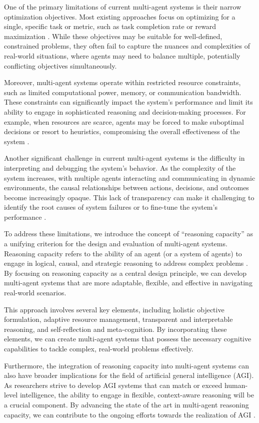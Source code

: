 \documentclass[11pt]{article}
\begin{document}
One of the primary limitations of current multi-agent systems is their narrow optimization objectives. Most existing approaches focus on optimizing for a single, specific task or metric, such as task completion rate or reward maximization \cite{ref341}. While these objectives may be suitable for well-defined, constrained problems, they often fail to capture the nuances and complexities of real-world situations, where agents may need to balance multiple, potentially conflicting objectives simultaneously.

Moreover, multi-agent systems operate within restricted resource constraints, such as limited computational power, memory, or communication bandwidth. These constraints can significantly impact the system's performance and limit its ability to engage in sophisticated reasoning and decision-making processes. For example, when resources are scarce, agents may be forced to make suboptimal decisions or resort to heuristics, compromising the overall effectiveness of the system \cite{ref233}.

Another significant challenge in current multi-agent systems is the difficulty in interpreting and debugging the system's behavior. As the complexity of the system increases, with multiple agents interacting and communicating in dynamic environments, the causal relationships between actions, decisions, and outcomes become increasingly opaque. This lack of transparency can make it challenging to identify the root causes of system failures or to fine-tune the system's performance \cite{ref342}.

To address these limitations, we introduce the concept of ``reasoning capacity'' as a unifying criterion for the design and evaluation of multi-agent systems. Reasoning capacity refers to the ability of an agent (or a system of agents) to engage in logical, causal, and strategic reasoning to address complex problems \cite{ref342}. By focusing on reasoning capacity as a central design principle, we can develop multi-agent systems that are more adaptable, flexible, and effective in navigating real-world scenarios.

This approach involves several key elements, including holistic objective formulation, adaptive resource management, transparent and interpretable reasoning, and self-reflection and meta-cognition. By incorporating these elements, we can create multi-agent systems that possess the necessary cognitive capabilities to tackle complex, real-world problems effectively.

Furthermore, the integration of reasoning capacity into multi-agent systems can also have broader implications for the field of artificial general intelligence (AGI). As researchers strive to develop AGI systems that can match or exceed human-level intelligence, the ability to engage in flexible, context-aware reasoning will be a crucial component. By advancing the state of the art in multi-agent reasoning capacity, we can contribute to the ongoing efforts towards the realization of AGI \cite{ref343}.
\end{document}
